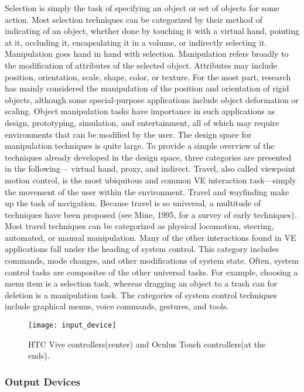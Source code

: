 Selection is simply the task of specifying an object or set of objects for some action. 
Most selection techniques can be categorized by their method of indicating of an object, whether 
done by touching it with a virtual hand, pointing at it, occluding it, encapsulating it in a volume, or 
indirectly selecting it. Manipulation goes hand in hand with selection. Manipulation refers broadly to the  modification of 
attributes of the selected object. Attributes may include position, orientation, scale, shape, color, 
or texture. For the most part, research has mainly considered the manipulation of the  position 
and orientation of rigid objects, although some special-purpose applications include object deformation or scaling. Object manipulation tasks have importance in such applications as design, 
prototyping, simulation, and entertainment, all of which may require environments that can be 
modified by the user. The design space for manipulation techniques is quite large. To provide a simple overview of the 
techniques already developed in the design space, three categories are presented in the following—
virtual hand, proxy, and indirect. Travel, also called viewpoint motion control, is the most ubiquitous and common \gls{VE} interaction 
task—simply the movement of the user within the environment. Travel and wayfinding make up the task of navigation. Because travel is so universal, a multitude of techniques have been proposed 
(see Mine, 1995, for a survey of early techniques). Most travel techniques can be categorized as physical locomotion, 
steering, automated, or manual manipulation. Many of the other interactions found in VE applications fall under the heading of system control. 
This category includes commands, mode changes, and other modifications of system state. 
Often, system control tasks are composites of the other universal tasks. For example, choosing
a menu item is a selection task, whereas dragging an object to a trash can for deletion is a 
manipulation task. The categories of system control techniques include graphical 
menus, voice commands, gestures, and tools.~\cite{hale2014handbook}


\begin{figure}[h!]
    \centering
    \texttt{[image: input\_device]}
    \caption{HTC Vive controllers(center) and Oculus Touch controllers(at the ends).~\cite{article_input_devices}}
    \label{fig:input_device}
\end{figure}


\subsubsection{Output Devices}
\label{sec:output_devices}

